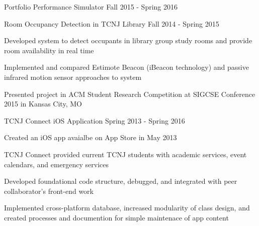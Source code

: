 

\begin{cventries}

  \bproject
    {Portfolio Performance Simulator} %
    {Fall 2015 - Spring 2016} %
    {
      \begin{cvitems} %
        \item {}
        \item {}
        \item {}
      \end{cvitems}
    }

  \bproject
    {Room Occupancy Detection in TCNJ Library} %
    {Fall 2014 - Spring 2015} %
    {
      \begin{cvitems} %
        \item {Developed system to detect occupants in library group study rooms and provide room availability in real time}
        \item {Implemented and compared Estimote Beacon (iBeacon technology) and passive infrared motion sensor approaches to system}
        \item {Presented project in ACM Student Research Competition at SIGCSE Conference 2015 in Kansas City, MO}
      \end{cvitems}
    }

  \bproject
    {TCNJ Connect iOS Application} %
    {Spring 2013 - Spring 2016} %
    {
      \begin{cvitems} %
        \item {Created an iOS app avaialbe on App Store in May 2013}
        \item {TCNJ Connect provided current TCNJ students with academic services, event calendars, and emergency services}
        \item {Developed foundational code structure, debugged, and integrated with peer collaborator's front-end work}
        \item {Implemented cross-platform database, increased modularity of class design, and created processes and documention for simple maintenace of app content}
      \end{cvitems}
    }

\end{cventries}
